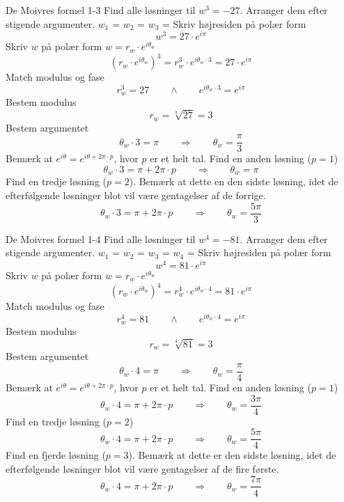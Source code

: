 \documentclass{article}
\begin{document}
\newpage
\begin{exercise}{De Moivres formel 1-3}
Find alle løsninger til $w^3 = - 27$.
Arranger dem efter stigende argumenter.
$w_1$ = 
$w_2$ = 
$w_3$ = 
\hint
Skriv højresiden på polær form
\[w^3 = 27 \cdot e^{i \pi}
\]
\hint
Skriv $w$ på polær form $w = r_w \cdot e^{i \theta_w}$
\[\left(r_w \cdot e^{i \theta_w}\right)^3 = r_w^3 \cdot e^{i \theta_w \cdot 3} = 27 \cdot e^{i \pi}
\]
\hint
Match modulus og fase
\[r_w^3 = 27 \qquad \wedge \qquad e^{i \theta_w \cdot 3} = e^{i \pi}
\]
\hint
Bestem modulus
\[r_w = \sqrt[3]{27} = 3
\]
\hint
Bestem argumentet
\[\theta_w \cdot 3 = \pi \qquad \Rightarrow \qquad \theta_w = \frac{\pi}{3}
\]
\hint
Bemærk at $e^{i \theta} = e^{i \theta + 2 \pi \cdot p}$, hvor $p$ er et helt tal.
\hint
Find en anden løsning ($p = 1$)
\[\theta_w \cdot 3 = \pi + 2 \pi \cdot p \qquad \Rightarrow \qquad \theta_w = \pi
\]
\hint
Find en tredje løsning ($p = 2$).
Bemærk at dette en den sidste løsning, idet de efterfølgende
løsninger blot vil være gentagelser af de forrige.
\[\theta_w \cdot 3 = \pi + 2 \pi \cdot p \qquad \Rightarrow \qquad \theta_w = \frac{5 \pi}{3}
\]
\end{exercise}
\newpage
\begin{exercise}{De Moivres formel 1-4}
Find alle løsninger til $w^4 = - 81$.
Arranger dem efter stigende argumenter.
$w_1$ = 
$w_2$ = 
$w_3$ = 
$w_4$ = 
\hint
Skriv højresiden på polær form
\[w^4 = 81 \cdot e^{i \pi}
\]
\hint
Skriv $w$ på polær form $w = r_w \cdot e^{i \theta_w}$
\[\left(r_w \cdot e^{i \theta_w}\right)^4 = r_w^4 \cdot e^{i \theta_w \cdot 4} = 81 \cdot e^{i \pi}
\]
\hint
Match modulus og fase
\[r_w^4 = 81 \qquad \wedge \qquad e^{i \theta_w \cdot 4} = e^{i \pi}
\]
\hint
Bestem modulus
\[r_w = \sqrt[4]{81} = 3
\]
\hint
Bestem argumentet
\[\theta_w \cdot 4 = \pi \qquad \Rightarrow \qquad \theta_w = \frac{\pi}{4}
\]
\hint
Bemærk at $e^{i \theta} = e^{i \theta + 2 \pi \cdot p}$, hvor $p$ er et helt tal.
\hint
Find en anden løsning ($p = 1$)
\[\theta_w \cdot 4 = \pi + 2 \pi \cdot p \qquad \Rightarrow \qquad \theta_w = \frac{3 \pi}{4}
\]
\hint
Find en tredje løsning ($p = 2$)
\[\theta_w \cdot 4 = \pi + 2 \pi \cdot p \qquad \Rightarrow \qquad \theta_w = \frac{5 \pi}{4}
\]
\hint
Find en fjerde løsning ($p = 3$).
Bemærk at dette er den sidste løsning, idet de efterfølgende
løsninger blot vil være gentagelser af de fire første.
\[\theta_w \cdot 4 = \pi + 2 \pi \cdot p \qquad \Rightarrow \qquad \theta_w = \frac{7 \pi}{4}
\]
\end{exercise}
\end{document}
